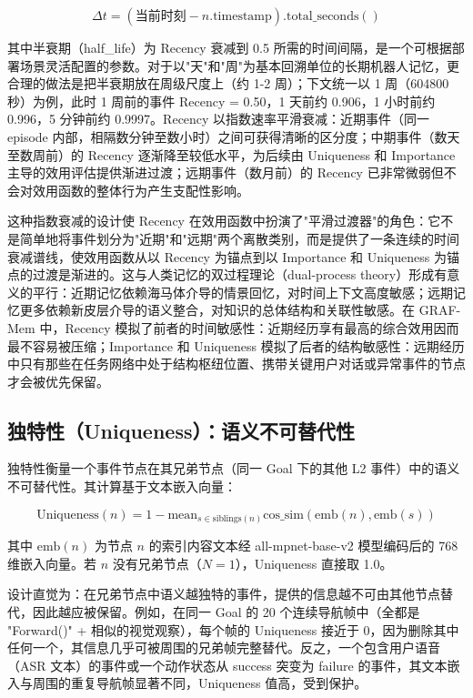 \begin{equation}
\Delta t = (\text{当前时刻} - n.\mathrm{timestamp}).\text{total\_seconds}()
\label{eq:4-4}
\end{equation}

其中半衰期（half\_life）为 Recency 衰减到 0.5 所需的时间间隔，是一个可根据部署场景灵活配置的参数。对于以"天"和"周"为基本回溯单位的长期机器人记忆，更合理的做法是把半衰期放在周级尺度上（约 1-2 周）；下文统一以 1 周（604800 秒）为例，此时 1 周前的事件 Recency = 0.50，1 天前约 0.906，1 小时前约 0.996，5 分钟前约 0.9997。Recency 以指数速率平滑衰减：近期事件（同一 episode 内部，相隔数分钟至数小时）之间可获得清晰的区分度；中期事件（数天至数周前）的 Recency 逐渐降至较低水平，为后续由 Uniqueness 和 Importance 主导的效用评估提供渐进过渡；远期事件（数月前）的 Recency 已非常微弱但不会对效用函数的整体行为产生支配性影响。

这种指数衰减的设计使 Recency 在效用函数中扮演了"平滑过渡器"的角色：它不是简单地将事件划分为"近期"和"远期"两个离散类别，而是提供了一条连续的时间衰减谱线，使效用函数从以 Recency 为锚点到以 Importance 和 Uniqueness 为锚点的过渡是渐进的。这与人类记忆的双过程理论（dual-process theory）形成有意义的平行：近期记忆依赖海马体介导的情景回忆，对时间上下文高度敏感；远期记忆更多依赖新皮层介导的语义整合，对知识的总体结构和关联性敏感。在 GRAF-Mem 中，Recency 模拟了前者的时间敏感性：近期经历享有最高的综合效用因而最不容易被压缩；Importance 和 Uniqueness 模拟了后者的结构敏感性：远期经历中只有那些在任务网络中处于结构枢纽位置、携带关键用户对话或异常事件的节点才会被优先保留。

\subsection{独特性（Uniqueness）：语义不可替代性}

独特性衡量一个事件节点在其兄弟节点（同一 Goal 下的其他 L2 事件）中的语义不可替代性。其计算基于文本嵌入向量：

\begin{equation}
\text{Uniqueness}(n) = 1 - \text{mean}_{s \in \mathrm{siblings}(n)} \mathrm{cos\_sim}(\mathrm{emb}(n), \mathrm{emb}(s))
\label{eq:4-5}
\end{equation}

其中 $\mathrm{emb}(n)$ 为节点 $n$ 的索引内容文本经 all-mpnet-base-v2 模型编码后的 768 维嵌入向量。若 $n$ 没有兄弟节点（$N=1$），Uniqueness 直接取 1.0。

设计直觉为：在兄弟节点中语义越独特的事件，提供的信息越不可由其他节点替代，因此越应被保留。例如，在同一 Goal 的 20 个连续导航帧中（全都是 "Forward()" + 相似的视觉观察），每个帧的 Uniqueness 接近于 0，因为删除其中任何一个，其信息几乎可被周围的兄弟帧完整替代。反之，一个包含用户语音（ASR 文本）的事件或一个动作状态从 success 突变为 failure 的事件，其文本嵌入与周围的重复导航帧显著不同，Uniqueness 值高，受到保护。

